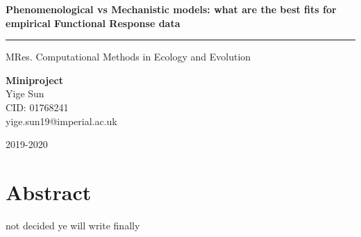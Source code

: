 \documentclass[11pt, a4paper]{article}
\begin{document}
 
	
	\begin{titlepage} 
		\centering 
		
		
		\vspace*{\baselineskip} 
		
		
		\vspace{0.75\baselineskip} %
		
		{\LARGE \textbf{Phenomenological vs Mechanistic models: what are the best fits for empirical Functional Response data}} %
		
		\vspace{0.1\baselineskip} %
		
		\rule{\textwidth}{1.6pt} %
		
		\vspace{1\baselineskip} %
		MRes. Computational Methods in Ecology and Evolution
		
		{\large \textbf{Miniproject}}\\ %
		\vspace*{2\baselineskip} %
		{\Large Yige Sun} \\%
		CID: 01768241\\
		yige.sun19@imperial.ac.uk
		
		\vfill %
		
		{\LARGE 2019-2020} 
		\vspace{1\baselineskip}
	\end{titlepage}

\linenumbers
\section{Abstract}
not decided ye will write finally
\end{document}
